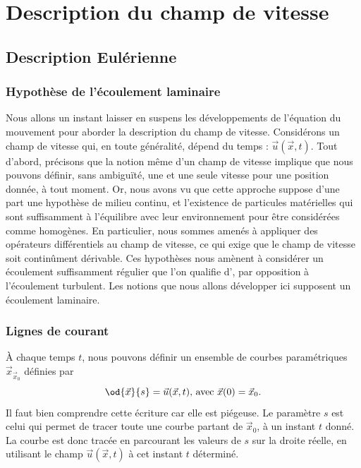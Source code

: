 \chapter{Description du champ de vitesse}

\section{Description Eulérienne}

\subsection{Hypothèse de l'écoulement laminaire}
Nous allons un instant laisser en suspens les développements de l'équation du mouvement pour aborder la description du champ de vitesse.
Considérons un champ de vitesse qui, en toute généralité, dépend du temps : $\vec{u}(\vec{x}, t)$.
Tout d'abord, précisons que la notion même d'un champ de vitesse implique que nous pouvons définir, sans ambiguïté, une et une seule vitesse pour une position donnée, à tout moment. Or, nous avons vu que cette approche suppose d'une part une hypothèse de milieu continu, et l'existence de particules matérielles qui sont suffisamment à l'équilibre avec leur environnement pour être considérées comme homogènes. En particulier, nous sommes amenés à appliquer des opérateurs différentiels au champ de vitesse, ce qui exige que le champ de vitesse soit continûment dérivable.
Ces hypothèses nous amènent à considérer un écoulement suffisamment régulier que l'on qualifie d', par opposition à l'écoulement turbulent. Les notions que nous allons développer ici supposent un écoulement laminaire.

\subsection{Lignes de courant}
À chaque temps $t$, nous pouvons définir un ensemble de courbes paramétriques $\vec{x}_{\vec{x}_0}$ définies par
\begin{equation}
  \od{\vec{x}}{s} = \vec{u}(\vec{x},t)\text{, avec $\vec{x}(0)=\vec{x}_0$}.
  \label{eq:ligne_courant}
\end{equation}
Il faut bien comprendre cette écriture car elle est piégeuse. Le paramètre $s$ est celui qui permet de tracer toute une courbe partant de $\vec{x}_0$, à un instant $t$ donné. La courbe est donc tracée en parcourant les valeurs de $s$ sur la droite réelle, en utilisant le champ $\vec{u}(\vec{x},t)$ à cet instant $t$ déterminé.

